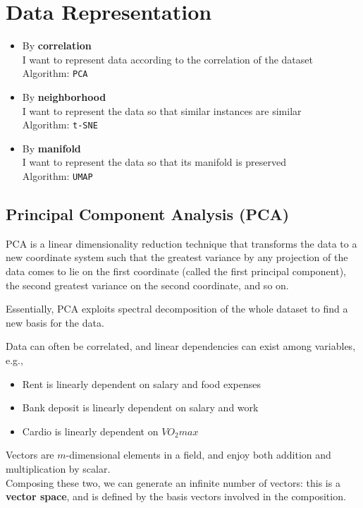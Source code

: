 \chapter{Data Representation}

\begin{itemize}
	\item By \textbf{correlation}\\ 
   I want to represent data according to the correlation of the dataset\\
Algorithm: \texttt{PCA}
	\item By \textbf{neighborhood}\\ I want to represent the data so that similar instances are similar\\
Algorithm: \texttt{t-SNE}
	\item By \textbf{manifold}\\ 
   I want to represent the data so that its manifold is preserved\\
Algorithm: \texttt{UMAP}
\end{itemize}


\section{Principal Component Analysis (PCA)}

PCA is a linear dimensionality reduction technique
that transforms the data to a new coordinate system such that the greatest variance by any projection of the data comes to lie on the first coordinate (called the first principal component), the second greatest variance on the second coordinate, and so on.

Essentially, PCA exploits spectral decomposition of the whole dataset to find a new basis for the data.

Data can often be correlated, and linear dependencies can exist among variables,
e.g.,
\begin{itemize}
	\item Rent is linearly dependent on salary and food expenses
	\item Bank deposit is linearly dependent on salary and work
	\item Cardio is linearly dependent on $VO_2 max$
\end{itemize}

Vectors are $m$-dimensional elements in a field, and enjoy both addition and multiplication by scalar.\\ Composing these two, we can generate an infinite number of vectors: this is a \textbf{vector space}, and is defined by the basis vectors involved in the composition.

